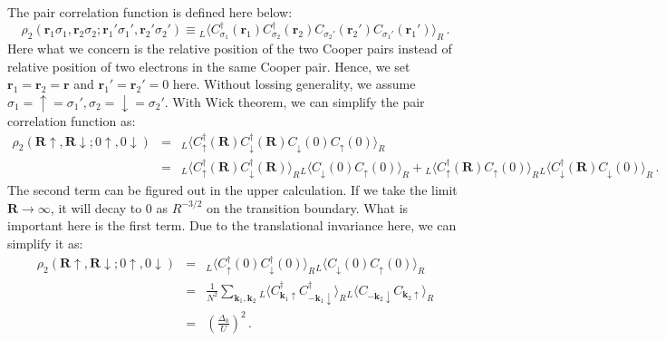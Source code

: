 \documentclass[aps,onecolumn,nofootinbib,superscriptaddress,notitlepage,longbibliography]{revtex4-1}
\begin{document}
The pair correlation function is defined here below: 
\begin{equation}
\rho_{2}(\boldsymbol{r}_{1}\sigma_{1},\boldsymbol{r}_{2}\sigma_{2};\boldsymbol{r}_{1}'\sigma_{1}',\boldsymbol{r}_{2}'\sigma_{2}')\equiv{}_{L}\langle C_{\sigma_{1}}^{\dagger}(\boldsymbol{r}_{1})C_{\sigma_{2}}^{\dagger}(\boldsymbol{r}_{2})C_{\sigma_{2}'}(\boldsymbol{r}_{2}')C_{\sigma_{1}'}(\boldsymbol{r}_{1}')\rangle_{R}\,.
\end{equation}
Here what we concern is the relative position of the two Cooper pairs
instead of relative position of two electrons in the same Cooper pair.
Hence, we set $\boldsymbol{r}_{1}=\boldsymbol{r}_{2}=\boldsymbol{r}$
and $\boldsymbol{r}_{1}'=\boldsymbol{r}_{2}'=0$ here. Without lossing
generality, we assume $\sigma_{1}=\uparrow=\sigma_{1}',\sigma_{2}=\downarrow=\sigma_{2}'$.
With Wick theorem, we can simplify the pair correlation function as:
\begin{eqnarray}
\rho_{2}(\boldsymbol{R}\uparrow,\boldsymbol{R}\downarrow;0\uparrow,0\downarrow) & = & _{L}\langle C_{\uparrow}^{\dagger}(\boldsymbol{R})C_{\downarrow}^{\dagger}(\boldsymbol{R})C_{\downarrow}(0)C_{\uparrow}(0)\rangle_{R}\nonumber \\
 & = & _{L}\langle C_{\uparrow}^{\dagger}(\boldsymbol{R})C_{\downarrow}^{\dagger}(\boldsymbol{R})\rangle_{R}{}_{L}\langle C_{\downarrow}(0)C_{\uparrow}(0)\rangle_{R}+{}_{L}\langle C_{\uparrow}^{\dagger}(\boldsymbol{R})C_{\uparrow}(0)\rangle_{R}{}_{L}\langle C_{\downarrow}^{\dagger}(\boldsymbol{R})C_{\downarrow}(0)\rangle_{R}\,.
\end{eqnarray}
The second term can be figured out in the upper calculation. If we
take the limit $\boldsymbol{R}\rightarrow\infty$, it will decay to
0 as $R^{-3/2}$ on the transition boundary. What is important here
is the first term. Due to the translational invariance here, we can
simplify it as: 
\begin{eqnarray}
\rho_{2}(\boldsymbol{R}\uparrow,\boldsymbol{R}\downarrow;0\uparrow,0\downarrow) & = & _{L}\langle C_{\uparrow}^{\dagger}(0)C_{\downarrow}^{\dagger}(0)\rangle_{R}{}_{L}\langle C_{\downarrow}(0)C_{\uparrow}(0)\rangle_{R}\nonumber \\
 & = & \frac{1}{N^{2}}\sum_{\boldsymbol{k}_{1},\boldsymbol{k}_{2}}{}_{L}\langle C_{\boldsymbol{k}_{1}\uparrow}^{\dagger}C_{-\boldsymbol{k}_{1}\downarrow}^{\dagger}\rangle_{R}{}_{L}\langle C_{-\boldsymbol{k}_{2}\downarrow}C_{\boldsymbol{k}_{2}\uparrow}\rangle_{R}\nonumber \\
 & = & \left(\frac{\Delta_{0}}{U}\right)^{2}\,.
\end{eqnarray}
\end{document}

